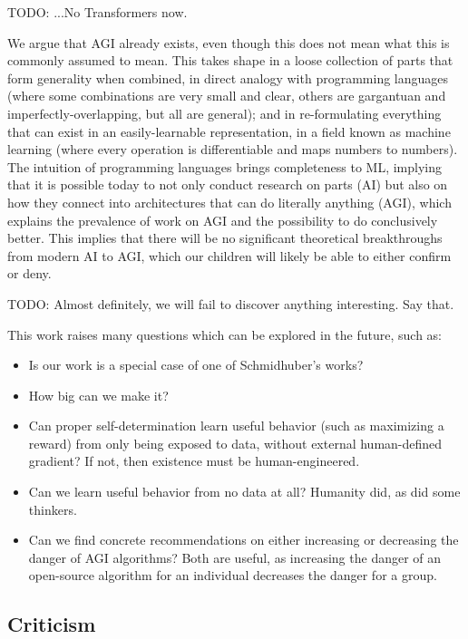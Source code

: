 \documentclass{article}
\begin{document}
    TODO: ...No Transformers now.

We argue that AGI already exists, even though this does not mean what this is commonly assumed to mean. This takes shape in a loose collection of parts that form generality when combined, in direct analogy with programming languages (where some combinations are very small and clear, others are gargantuan and imperfectly-overlapping, but all are general); and in re-formulating everything that can exist in an easily-learnable representation, in a field known as machine learning (where every operation is differentiable and maps numbers to numbers). The intuition of programming languages brings completeness to ML, implying that it is possible today to not only conduct research on parts (AI) but also on how they connect into architectures that can do literally anything (AGI), which explains the prevalence of work on AGI and the possibility to do conclusively better. This implies that there will be no significant theoretical breakthroughs from modern AI to AGI, which our children will likely be able to either confirm or deny.

    TODO: Almost definitely, we will fail to discover anything interesting. Say that.

This work raises many questions which can be explored in the future, such as:

\begin{itemize}
\item Is our work is a special case of one of Schmidhuber's works?

\item How big can we make it?

\item Can proper self-determination learn useful behavior (such as maximizing a reward) from only being exposed to data, without external human-defined gradient? If not, then existence must be human-engineered.

\item Can we learn useful behavior from no data at all? Humanity did, as did some thinkers.

\item Can we find concrete recommendations on either increasing or decreasing the danger of AGI algorithms? Both are useful, as increasing the danger of an open-source algorithm for an individual decreases the danger for a group.
\end{itemize}

\subsection{Criticism}
\end{document}
